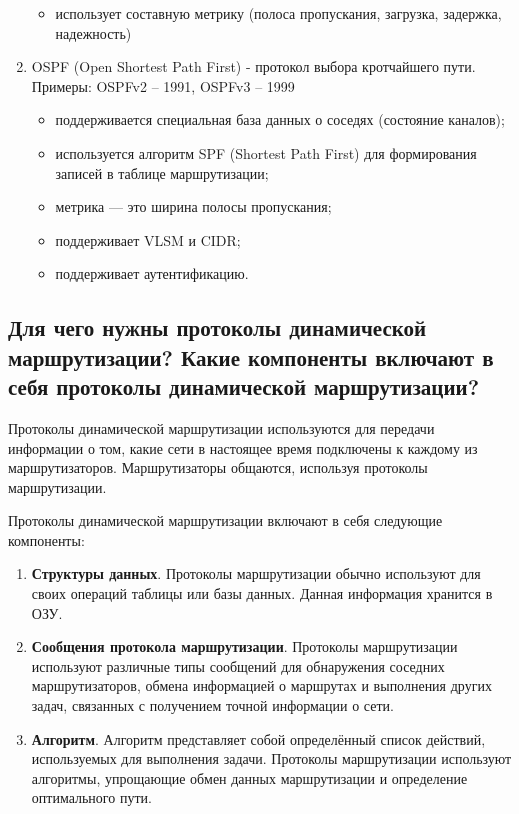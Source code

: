 \begin{enumerate}
\begin{itemize}
        \item использует составную метрику
        (полоса пропускания, загрузка, задержка, надежность)
    \end{itemize}
    \item OSPF (Open Shortest Path First) - протокол выбора кротчайшего пути.
    Примеры: OSPFv2 – 1991, OSPFv3 – 1999
    \begin{itemize}
        \item поддерживается специальная база данных о соседях
        (состояние каналов);
        \item используется алгоритм SPF (Shortest Path First)
        для формирования записей в таблице маршрутизации;
        \item метрика --- это ширина полосы пропускания;
        \item поддерживает VLSM и CIDR;
        \item поддерживает аутентификацию.
    \end{itemize}
\end{enumerate}

\subsection{Для чего нужны протоколы динамической маршрутизации?
Какие компоненты включают в себя протоколы динамической маршрутизации?}

Протоколы динамической маршрутизации используются для передачи информации
о том, какие сети в настоящее время подключены к каждому из маршрутизаторов.
Маршрутизаторы общаются, используя протоколы маршрутизации.

Протоколы динамической маршрутизации включают в себя следующие компоненты:

\begin{enumerate}
    \item \textbf{Структуры данных}. Протоколы маршрутизации обычно используют
    для своих операций таблицы или базы данных.
    Данная информация хранится в ОЗУ.
    \item \textbf{Сообщения протокола маршрутизации}.
    Протоколы маршрутизации используют различные типы сообщений
    для обнаружения соседних маршрутизаторов,
    обмена информацией о маршрутах и выполнения других задач,
    связанных с получением точной информации о сети.
    \item \textbf{Алгоритм}. Алгоритм представляет собой определённый
    список действий, используемых для выполнения задачи.
    Протоколы маршрутизации используют алгоритмы,
    упрощающие обмен данных маршрутизации и определение оптимального пути.
\end{enumerate}

